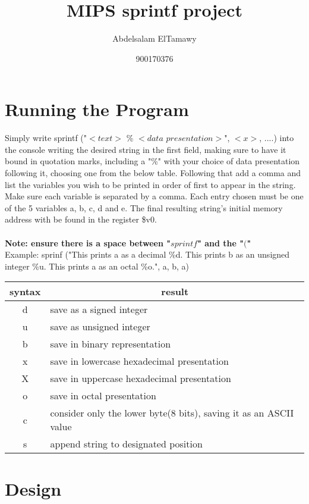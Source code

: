 \documentclass[12pt,a4paper]{article}
\title{MIPS sprintf project}
\author{Abdelsalam ElTamawy}
\date{900170376}
\begin{document}
\maketitle

\section{Running the Program}

Simply write sprintf ("$<text>$ \% $<data$ $presentation>$", $<x>$, ....) into the console writing the desired string in the first field, making sure to have it bound in quotation marks, including a "\%" with your choice of data presentation following it, choosing one from the below table. Following that add a comma and list the variables you wish to be printed in order of first to appear in the string. Make sure each variable is separated by a comma. Each entry chosen must be one of the 5 variables a, b, c, d and e. The final resulting string's initial memory address with be found in the register \$v0.
\\
\\
\textbf{Note: ensure there is a space between "$sprintf$" and the "$($"}
\\

\noindent \small{Example: sprinf ("This prints a as a decimal \%d. This prints b as an unsigned integer \%u. This prints a as an octal \%o.", a, b, a)}
\\

\begin{tabular}{c|l}
syntax & \multicolumn{1}{c}{result}\\
\hline
d & save as a signed integer \\ 
u & save as unsigned integer \\ 
b & save in binary representation \\ 
x & save in lowercase hexadecimal presentation \\ 
X & save in uppercase hexadecimal presentation \\ 
o & save in octal presentation \\ 
c & consider only the lower byte(8 bits), saving it as an ASCII value \\ 
s & append string to designated position \\ 
\end{tabular} 

\section{Design}
\end{document}
